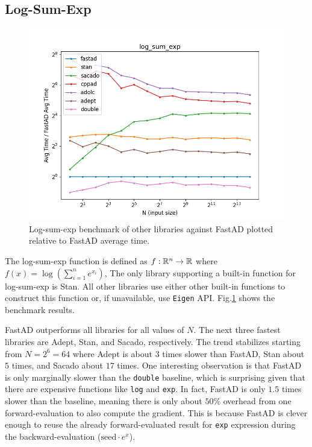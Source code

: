 \subsection{Log-Sum-Exp}

\begin{figure}[t]
    \centering
    \includegraphics[width=\textwidth]{figs/log_sum_exp_fig.png}
    \caption{%
        Log-sum-exp benchmark of other libraries against FastAD 
        plotted relative to FastAD average time.
    }\label{fig:log_sum_exp}
\end{figure}

The log-sum-exp function is defined as $f:\mathbb{R}^n \to \mathbb{R}$ 
where~$f(x) = \log(\sum\limits_{i=1}^n e^{x_i})$,
The only library supporting a built-in function for log-sum-exp is Stan.
All other libraries use either other built-in functions to construct this function or,
if unavailable, use \verb|Eigen| API.\@
Fig.\ref{fig:log_sum_exp} shows the benchmark results.

FastAD outperforms all libraries for all values of $N$.
The next three fastest libraries are Adept, Stan, and Sacado, respectively.
The trend stabilizes starting from $N=2^6=64$ where 
Adept is about $ 3$ times slower than FastAD, 
Stan about $ 5$ times, and 
Sacado about $ 17$ times.
One interesting observation is that FastAD is only marginally slower than the \verb|double| baseline,
which is surprising given that there are expensive functions like \verb|log| and \verb|exp|.
In fact, FastAD is only $ 1.5$ times slower than the baseline, meaning there is only about $ 50\%$
overhead from one forward-evaluation to also compute the gradient.
This is because FastAD is clever enough to reuse 
the already forward-evaluated result for \verb|exp| expression
during the backward-evaluation ($\text{seed} \cdot e^x$).

